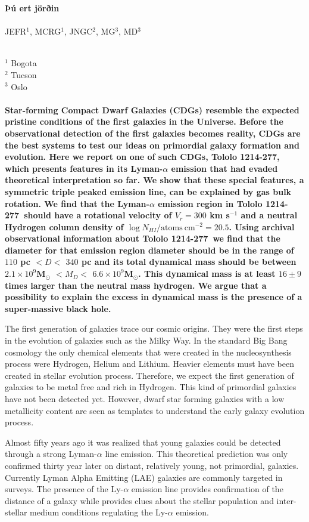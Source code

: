 \documentclass[a4paper, usenatbib, 12pt]{article}
\newcommand{\tol}{Tololo 1214-277}
\begin{document}
\pagestyle{empty}
\noindent
\textbf{Þú ert jörðin}
\\
\\
JEFR$^{1}$, MCRG$^1$, JNGC$^2$, MG$^3$, MD$^3$
\\
\\
\scriptsize
{$^1$ Bogota
\\
$^2$ Tucson
\\
$^3$ Oslo
\normalsize
\\
\\
\textbf{
  Star-forming Compact Dwarf Galaxies (CDGs) resemble the expected
  pristine conditions of the first galaxies in the Universe.    
Before the observational detection of the first galaxies becomes
reality, CDGs are the best systems to test our ideas on primordial
galaxy formation and evolution.    
Here we report on one of such CDGs, \tol, which presents
features in its Lyman-$\alpha$ emission that had evaded theoretical
interpretation so far. 
We show that these special features, a symmetric triple peaked
emission line, can be explained by gas bulk rotation.  
We find that the Lyman-$\alpha$ emission region in \tol\ should
have a rotational velocity of $V_{r}=300$ km s$^{-1}$ and a neutral
Hydrogen column density of $\log N_{HI} / \mathrm{atoms\ cm}^{-2} =
  20.5$.   
Using archival observational information about \tol\ we find that the
diameter for that emission region diameter should be in the range of
$110$ pc $<D<$ $340$ pc and its total dynamical mass   should be
between $2.1\times 10^{9}$M$_{\odot}$ $<M_D<$  $6.6\times
10^{9}$M$_{\odot}$.  
This dynamical mass is at least $16\pm 9$ times
larger than the neutral mass hydrogen.
We argue that a possibility to explain the excess in
dynamical mass is the presence of a super-massive black hole. }  



The first generation of galaxies trace our cosmic origins. 
They were the first steps in the evolution of galaxies such as the Milky
Way. 
In the standard Big Bang cosmology the only chemical elements that
were created in the nucleosynthesis process were Hydrogen, Helium and
Lithium.  
Heavier elements must have been created in stellar evolution process. 
Therefore, we expect the first generation of
galaxies to be metal free and rich in Hydrogen. 
This kind of primordial galaxies have not been detected yet. 
However, dwarf star forming galaxies with a low metallicity content
are seen as templates to understand the early galaxy evolution process. 

Almost fifty years ago \cite{PartridgePeebles} it was realized that
young galaxies could be detected through a strong Lyman-$\alpha$ line
emission.  
This theoretical prediction was only confirmed thirty year later on
distant, relatively young, not primordial, galaxies.
Currently Lyman Alpha Emitting (LAE) galaxies are commonly targeted
in surveys. 
The presence of the Ly-$\alpha$ emission line provides confirmation of
the distance of a galaxy while provides clues about the stellar
population and inter-stellar medium conditions regulating the
Ly-$\alpha$ emission. 

}
\end{document}
